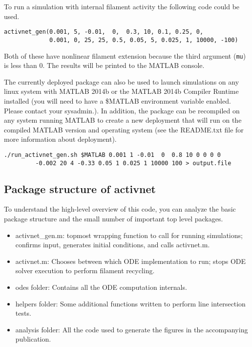 To run a simulation with internal filament activity the following code could be used.

\begin{verbatim}
activnet_gen(0.001, 5, -0.01,  0,  0.3, 10, 0.1, 0.25, 0, 
             0.001, 0, 25, 25, 0.5, 0.05, 5, 0.025, 1, 10000, -100)
\end{verbatim}

Both of these have nonlinear filament extension because the third argument (\texttt{mu}) is less than 0.  The results will be printed to the MATLAB console.

The currently deployed package can also be used to launch simulations on any linux system with MATLAB 2014b or the MATLAB 2014b Compiler Runtime installed (you will need to have a \$MATLAB environment variable enabled.  Please contact your sysadmin.).  In addition, the package can be recompiled on any system running MATLAB to create a new deployment that will run on the compiled MATLAB version and operating system (see the README.txt file for more information about deployment).  

\begin{verbatim}
./run_activnet_gen.sh $MATLAB 0.001 1 -0.01  0  0.8 10 0 0 0 0 
         -0.002 20 4 -0.33 0.05 1 0.025 1 10000 100 > output.file
\end{verbatim}




\subsection{Package structure of activnet}

To understand the high-level overview of this code, you can analyze the basic package structure and the small number of important top level packages.

\begin{itemize}
	\item  activnet\_gen.m: topmost wrapping function to call for running simulations; confirms input, generates initial conditions, and calls activnet.m.
	\item  activnet.m: Chooses between which ODE implementation to run; stops ODE solver execution to perform filament recycling.
	\item odes folder: Contains all the ODE computation internals.
	\item helpers folder: Some additional functions written to perform line intersection tests.
	\item analysis folder: All the code used to generate the figures in the accompanying publication.
\end{itemize}


